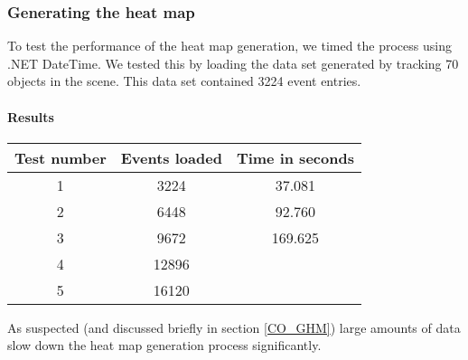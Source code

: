 \subsubsection{Generating the heat map}
\label{Test_P_Generating}
To test the performance of the heat map generation, we timed the process using .NET DateTime. We tested this by loading the data set generated by tracking 70 objects in the scene. This data set contained 3224 event entries.

\paragraph{Results}
\begin{center}
\begin{tabular}{| c | c | c |}
\hline
Test number & Events loaded & Time in seconds \\ 
\hline
1 & 3224 & 37.081 \\ 
\hline
2 & 6448 & 92.760 \\ 
\hline
3 & 9672 & 169.625 \\
\hline
4 & 12896 &  \\
\hline
5 & 16120 &  \\
\hline
\end{tabular}
\end{center}
As suspected (and discussed briefly in section \ref{CO_GHM}) large amounts of data slow down the heat map generation process significantly. 
